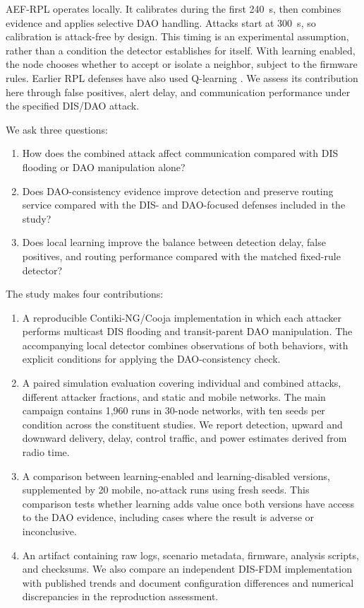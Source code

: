 \documentclass[journal]{IEEEtran}
\begin{document}
AEF-RPL operates locally. It calibrates during the first 240~s, then combines evidence and applies selective DAO handling. Attacks start at 300~s, so calibration is attack-free by design. This timing is an experimental assumption, rather than a condition the detector establishes for itself. With learning enabled, the node chooses whether to accept or isolate a neighbor, subject to the firmware rules. Earlier RPL defenses have also used Q-learning \cite{qsecrpl2023,itrpl2024}. We assess its contribution here through false positives, alert delay, and communication performance under the specified DIS/DAO attack.

We ask three questions:
\begin{enumerate}
\item[\emph{RQ1:}] How does the combined attack affect communication compared with DIS flooding or DAO manipulation alone?
\item[\emph{RQ2:}] Does DAO-consistency evidence improve detection and preserve routing service compared with the DIS- and DAO-focused defenses included in the study?
\item[\emph{RQ3:}] Does local learning improve the balance between detection delay, false positives, and routing performance compared with the matched fixed-rule detector?
\end{enumerate}

The study makes four contributions:
\begin{enumerate}
\item A reproducible Contiki-NG/Cooja implementation in which each attacker performs multicast DIS flooding and transit-parent DAO manipulation. The accompanying local detector combines observations of both behaviors, with explicit conditions for applying the DAO-consistency check.
\item A paired simulation evaluation covering individual and combined attacks, different attacker fractions, and static and mobile networks. The main campaign contains 1,960 runs in 30-node networks, with ten seeds per condition across the constituent studies. We report detection, upward and downward delivery, delay, control traffic, and power estimates derived from radio time.
\item A comparison between learning-enabled and learning-disabled versions, supplemented by 20 mobile, no-attack runs using fresh seeds. This comparison tests whether learning adds value once both versions have access to the DAO evidence, including cases where the result is adverse or inconclusive.
\item An artifact containing raw logs, scenario metadata, firmware, analysis scripts, and checksums. We also compare an independent DIS-FDM implementation with published trends and document configuration differences and numerical discrepancies in the reproduction assessment.
\end{enumerate}
\end{document}
